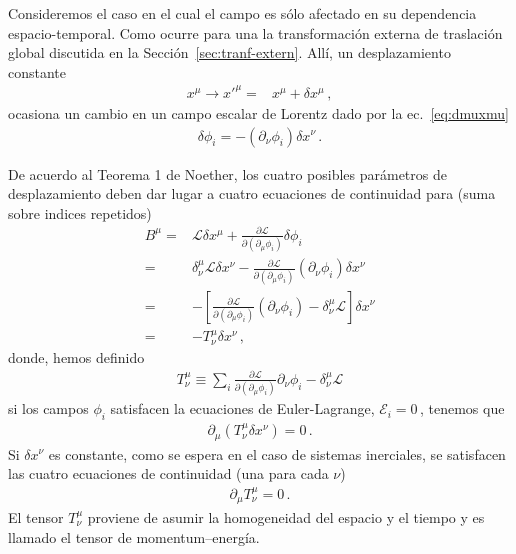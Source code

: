 \begin{frame}
  Consideremos el caso en el cual el campo es sólo afectado en su dependencia espacio-temporal. Como ocurre para una la transformación externa de traslación global
  discutida en la Sección~\ref{sec:tranf-extern}. Allí, un desplazamiento constante
\begin{align}
  x^\mu\to{x'}^\mu=&x^\mu+\delta x^{\mu}\,,
\end{align}
ocasiona un cambio en
  un campo escalar de Lorentz dado por la ec.~\eqref{eq:dmuxmu}
  \begin{align}
    \delta\phi_{i}=-\left( \partial_{\nu}\phi_i \right)\delta x^{\nu}\,.
  \end{align}

  De acuerdo al Teorema 1 de Noether, los cuatro posibles parámetros de desplazamiento deben dar lugar a cuatro ecuaciones de continuidad para (suma sobre indices repetidos)
\begin{align}
     B^{\mu}=& \mathcal{L} \delta x^{\mu} + \frac{\partial\mathcal{L}}{\partial(\partial_{\mu}\phi_i)}\delta\phi_{i} \nonumber\\
  =&\delta_{\nu}^{\mu} \mathcal{L} \delta x^{\nu} - \frac{\partial\mathcal{L}}{\partial(\partial_{\mu}\phi_i)} \left( \partial_{\nu}\phi_i \right)\delta x^{\nu}   \nonumber\\
  =&- \left[\frac{\partial\mathcal{L}}{\partial(\partial_{\mu}\phi_i)} \left( \partial_{\nu}\phi_i \right) - \delta_{\nu}^{\mu} \mathcal{L} \right] \delta x^{\nu}   \nonumber\\
  =&    - T^{\mu}_{\nu} \delta x^{\nu}\,,
\end{align}
donde, hemos definido
\begin{align}
  T^{\mu}_{\nu}\equiv\sum_i \frac{\partial\mathcal{L}}{\partial(\partial_{\mu}\phi_i)}\partial_{\nu}\phi_i-\delta^{\mu}_{\nu}\mathcal{L}
\end{align}
si los campos $\phi_{i}$ satisfacen la ecuaciones de Euler-Lagrange, $\mathcal{E}_i=0\,$, tenemos que
\begin{align}
  \partial_{\mu} \left( T^{\mu}_{\nu} \delta x^{\nu}\right)=0\,.
\end{align}
Si $\delta x^{\nu}$ es constante, como se espera en el caso de sistemas inerciales, se satisfacen las cuatro  ecuaciones de continuidad (una para cada $\nu$)
\begin{align}
  \partial_{\mu} T^{\mu}_{\nu}=0\,.
\end{align}
El tensor $T^\mu_\nu$ proviene de asumir la homogeneidad del espacio y el tiempo y es llamado el tensor de momentum--energía. 

\end{frame}
